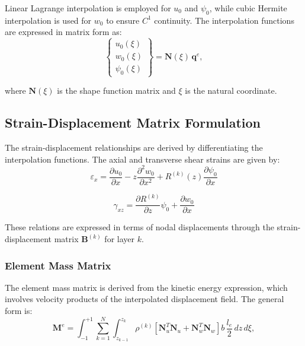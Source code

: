 \documentclass[12pt,a4paper]{report}
\begin{document}
Linear Lagrange interpolation is employed for $u_0$ and $\psi_0$, while cubic Hermite interpolation is used for $w_0$ to ensure $C^1$ continuity. The interpolation functions are expressed in matrix form as:
\begin{equation}
   \begin{Bmatrix} u_0(\xi) \\ w_0(\xi) \\ \psi_0(\xi) \end{Bmatrix} 
= \mathbf{N}(\xi) \, \mathbf{q}^e,
\end{equation}

where $\mathbf{N}(\xi)$ is the shape function matrix and $\xi$ is the natural coordinate.

\subsection*{Strain-Displacement Matrix Formulation}

The strain-displacement relationships are derived by differentiating the interpolation functions. The axial and transverse shear strains are given by:
\begin{equation}
    \varepsilon_x = \frac{\partial u_0}{\partial x} - z \frac{\partial^2 w_0}{\partial x^2} + R^{(k)}(z)\frac{\partial \psi_0}{\partial x}
\end{equation}

\begin{equation}
    \gamma_{xz} = \frac{\partial R^{(k)}}{\partial z} \psi_0 + \frac{\partial w_0}{\partial x}
\end{equation}


These relations are expressed in terms of nodal displacements through the strain-displacement matrix $\mathbf{B}^{(k)}$ for layer $k$.

\subsubsection*{Element Mass Matrix}

The element mass matrix is derived from the kinetic energy expression, which involves velocity products of the interpolated displacement field. The general form is:
\begin{equation}
    \mathbf{M}^e = \int_{-1}^{+1} \sum_{k=1}^{N} \int_{z_{k-1}}^{z_k} 
\rho^{(k)} \left[ \mathbf{N}_u^T \mathbf{N}_u + \mathbf{N}_w^T \mathbf{N}_w \right] b \, \frac{l_e}{2} \, dz \, d\xi,
\end{equation}
\end{document}
